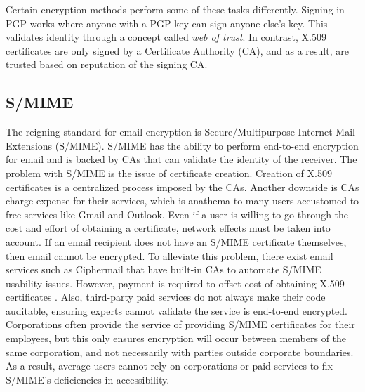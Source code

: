 \documentclass[10pt]{article}
\begin{document}
\begin{multicols}{2}
Certain encryption methods perform some of these tasks differently. Signing in PGP works where anyone with a PGP key can sign anyone else's key. This validates identity through a concept called \textit{web of trust}. In contrast, X.509 certificates are only signed by a Certificate Authority (CA), and as a result, are trusted based on reputation of the signing CA.

\subsection{S/MIME}
\par The reigning standard for email encryption is Secure/Multipurpose Internet Mail Extensions (S/MIME). S/MIME has the ability to perform end-to-end encryption for email and is backed by CAs that can validate the identity of the receiver. The problem with S/MIME is the issue of certificate creation. Creation of X.509 certificates is a centralized process imposed by the CAs\cite{garfinkel2005johnny}. Another downside is CAs charge expense for their services, which is anathema to many users accustomed to free services like Gmail and Outlook. Even if a user is willing to go through the cost and effort of obtaining a certificate, network effects must be taken into account. If an email recipient does not have an S/MIME certificate themselves, then email cannot be encrypted. To alleviate this problem, there exist email services such as Ciphermail that have built-in CAs to automate S/MIME usability issues. However, payment is required to offset cost of obtaining X.509 certificates \cite{ciphermail-gateway}. Also, third-party paid services do not always make their code auditable, ensuring experts cannot validate the service is end-to-end encrypted. Corporations often provide the service of providing S/MIME certificates for their employees, but this only ensures encryption will occur between members of the same corporation, and not necessarily with parties outside corporate boundaries. As a result, average users cannot rely on corporations or paid services to fix S/MIME's deficiencies in accessibility.

\end{multicols}
\end{document}
